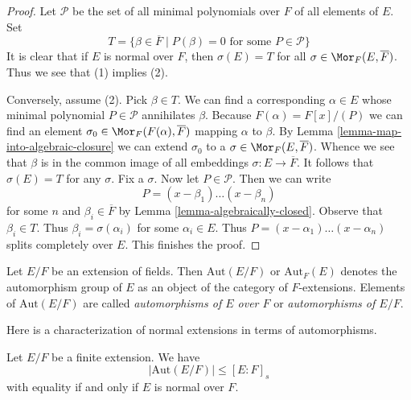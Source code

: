\begin{proof}
Let $\mathcal{P}$ be the set of all minimal polynomials over $F$ of
all elements of $E$. Set
$$
T =
\{\beta \in \overline{F} \mid P(\beta) = 0\text{ for some }P \in \mathcal{P}\}
$$
It is clear that if $E$ is normal over $F$, then $\sigma(E) = T$
for all $\sigma \in \Mor_F(E, \overline{F})$. Thus we see that (1)
implies (2).

\medskip\noindent
Conversely, assume (2). Pick $\beta \in T$.
We can find a corresponding $\alpha \in E$ whose minimal polynomial
$P \in \mathcal{P}$ annihilates $\beta$. Because $F(\alpha) = F[x]/(P)$
we can find an element $\sigma_0 \in \Mor_F(F(\alpha), \overline{F})$ mapping
$\alpha$ to $\beta$. By Lemma \ref{lemma-map-into-algebraic-closure}
we can extend $\sigma_0$ to a $\sigma \in \Mor_F(E, \overline{F})$.
Whence we see that $\beta$ is in the common image of all embeddings
$\sigma : E \to \overline{F}$. It follows that $\sigma(E) = T$
for any $\sigma$. Fix a $\sigma$. Now let $P \in \mathcal{P}$. Then we
can write
$$
P = (x - \beta_1) \ldots (x - \beta_n)
$$
for some $n$ and $\beta_i \in \overline{F}$ by
Lemma \ref{lemma-algebraically-closed}. Observe that $\beta_i \in T$.
Thus $\beta_i = \sigma(\alpha_i)$ for some $\alpha_i \in E$. Thus
$P = (x - \alpha_1) \ldots (x - \alpha_n)$ splits completely over $E$.
This finishes the proof.
\end{proof}

\begin{definition}
\label{definition-automorphisms}
Let $E/F$ be an extension of fields. Then $\text{Aut}(E/F)$ or
$\text{Aut}_F(E)$ denotes the automorphism group of $E$ as an object
of the category of $F$-extensions. Elements of $\text{Aut}(E/F)$
are called {\it automorphisms of $E$ over $F$} or
{\it automorphisms of $E/F$}.
\end{definition}

\noindent
Here is a characterization of normal extensions in terms of automorphisms.

\begin{lemma}
\label{lemma-normal-and-automorphisms}
Let $E/F$ be a finite extension. We have
$$
|\text{Aut}(E/F)| \leq [E : F]_s
$$
with equality if and only if $E$ is normal over $F$.
\end{lemma}

